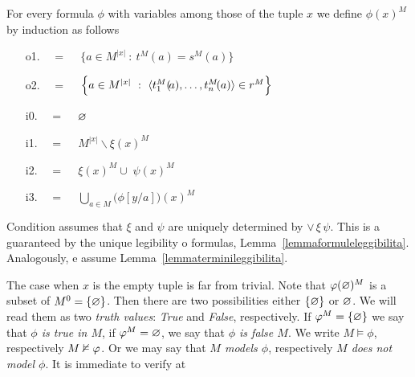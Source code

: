\begin{definition}[of truth]\label{defverita} For every formula $\phi$ with variables among those of the tuple $x$ we define \emph{$\phi(x)^M$\/} by induction as follows
\begin{itemize}
\item[o1.] \hspace*{15ex}\ \  =\ \ \  $\Big\{a\in M^{|x|}\ :\ t^M\!(a)=s^M\!(a) \Big\}$\medskip

\item[o2.] \hspace*{15ex}\ \   =\ \ \ $\Big\{a\in M^{|x|}\ :\ \<t_1^M(\!a),\dots,t_n^M\!(a)\>\in r^M\Big\}$\medskip

\item[i0.] \hspace*{15ex}\ \  =\ \ \  $\varnothing$\bigskip

\item[i1.] \hspace*{15ex}\ \   =\ \ \  $M^{|x|}\smallsetminus\xi(x)^M$\bigskip

\item[i2.] \hspace*{15ex}\ \   =\ \ \  $\xi(x)^M\cup\;\psi(x)^M$\bigskip

\item[i3.] \hspace*{15ex}\ \   =\ \ \ $\displaystyle\bigcup_{a\in M}\big(\phi[y/a]\big)(x)^M$
\end{itemize}
Condition  assumes that $\xi$ and $\psi$ are uniquely determined by $\vee\,\xi\,\psi$. This is a guaranteed by the unique legibility o formulas, Lemma~\ref{lemmaformuleleggibilita}. Analogously,  e  assume Lemma~\ref{lemmaterminileggibilita}. 
\end{definition}

The case when $x$ is the empty tuple is far from trivial. Note that $\varphi(\varnothing)^M$ is a subset of $M^0=\{\varnothing\}$. Then there are two possibilities either $\{\varnothing\}$ or $\varnothing$. We will read them as two \emph{truth values}: \emph{True\/} and \emph{False}, respectively. If $\varphi^M=\{\varnothing\}$ we say that \emph{$\phi$ is true in $M$}, if $\varphi^M=\varnothing$, we say that \emph{$\phi$ is false $M$}. We write \emph{$M\models\phi$}, respectively \emph{$M\nvDash\varphi$}. Or we may say that \emph{$M$ models $\phi$}, respectively \emph{$M$ does not model $\phi$}. It is immediate to verify at

